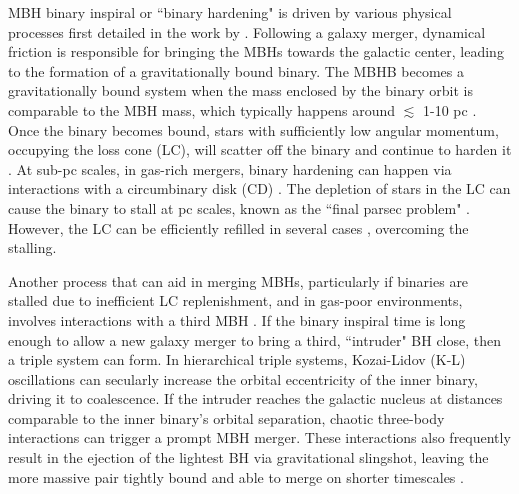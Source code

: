 \documentclass[twocolumn,linenumbers]{aastex701}
\begin{document}
MBH binary inspiral or ``binary hardening" is driven by various physical processes first detailed in the work by \citet{Begelman1980}. Following a galaxy merger, dynamical friction \citep{Chandreshkar1943,Antonini2012} is responsible for bringing the MBHs towards the galactic center, leading to the formation of a gravitationally bound binary. The MBHB becomes a gravitationally bound system when the mass enclosed by the binary orbit is comparable to the MBH mass, which typically happens around $\lesssim$ 1-10 pc \citep{Begelman1980,quinlan_dynamical_1996,Yu_2002}. Once the binary becomes bound, stars with sufficiently low angular momentum, occupying the loss cone (LC), will scatter off the binary and continue to harden it \citep{sesana2008, quinlan_dynamical_1996,quinlan_dynamical_1997, Merritt_review_2005}. At sub-pc scales, in gas-rich mergers, binary hardening can happen via interactions with a circumbinary disk (CD) \citep{Dotti2010,cuadra_massive_2009,nixon_tearing_2013,goicovic_infalling_2017,siwek_orbital_2023,siwek_preferential_2023,siwek_signatures_2024}. The depletion of stars in the LC can cause the binary to stall at pc scales, known as the ``final parsec problem" \citep{milosavljevic_final_2003}. However, the LC can be efficiently refilled in several cases \citep{Yu_2002, holleybockelmann2006lossconetriaxialgalaxies,berczik_2006,Holley_Bockelmann_2010,Preto_2011,Khan_2011,Holley-Bockelmann2015,Khan_2016}, overcoming the stalling.

Another process that can aid in merging MBHs, particularly if binaries are stalled due to inefficient LC replenishment, and in gas-poor
environments, involves interactions with a third MBH \citep[e.g.,][]{hoffman_dynamics_2007,ryu_interactions_2017,bonetti_post-newtonian_2018-1}. If the binary inspiral time is long enough to allow a new galaxy merger to bring a third, ``intruder" BH close, then a triple system can form. In hierarchical triple systems, Kozai-Lidov (K-L) oscillations \citep{Kozai1962,lidov_evolution_1962,Naoz_2016} can secularly increase the orbital eccentricity of the inner binary, driving it to coalescence. If the intruder reaches the galactic nucleus at distances comparable to the inner binary’s orbital separation, chaotic three-body interactions can trigger a prompt MBH merger. These interactions also frequently result in the ejection of the lightest BH via gravitational slingshot, leaving the more massive pair tightly bound and able to merge on shorter timescales \citep{saslaw_gravitational_1974,hills_encounters_1975,blaes_kozai_2002,iwasawa_evolution_2006,hoffman_dynamics_2007}.
\end{document}

